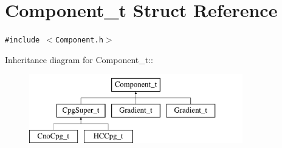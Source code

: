 \hypertarget{structComponent__t}{
\section{Component\_\-t Struct Reference}
\label{structComponent__t}
}
{\tt \#include $<$Component.h$>$}

Inheritance diagram for Component\_\-t::\begin{figure}[H]
\begin{center}
\leavevmode
\includegraphics[height=3cm]{structComponent__t}
\end{center}
\end{figure}
